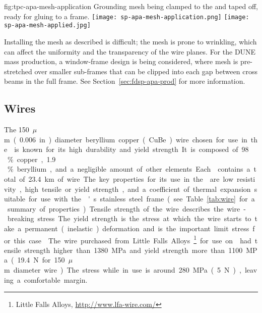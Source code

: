 \begin{dunefigure}{fig:tpc-apa-mesh-application}
{Grounding mesh being clamped to the  and taped off, ready for gluing to a  frame.}
\texttt{[image: sp-apa-mesh-application.png]} \quad
\texttt{[image: sp-apa-mesh-applied.jpg]}
\end{dunefigure}

Installing the mesh as described is difficult; the mesh is prone to wrinkling, %
which can affect the \efield uniformity and the transparency of the wire planes. For the DUNE mass production, a window-frame design is being considered, where mesh is pre-stretched over smaller sub-frames that can be clipped into each gap between cross beams in the full  frame.  See Section~\ref{sec:fdsp-apa-prod} for more information.


\subsection{Wires}
\label{sec:fdsp-apa-wires}

The \SI{150}{$\mu$m} (\SI{.006}{in}) diameter beryllium copper (CuBe) wire chosen for use in the  is known for its high durability and yield strength. It is composed of \num{98}\,\% copper, \num{1.9}\,\% beryllium, and a negligible amount of other elements. Each  contains a total of \SI{23.4}{km} of wire.  

The key properties for its use in the  are low resistivity, high tensile or yield strength, and a coefficient of thermal expansion suitable for use with the 's stainless steel frame (see Table~\ref{tab:wire} for a summary of properties).  Tensile strength of the wire describes the wire-breaking stress.  The yield strength is the stress at which the wire starts to take a permanent (inelastic) deformation and is the important limit stress for this case.  The wire purchased from Little Falls Alloys~\footnote{Little Falls Alloys\texttrademark, \url{http://www.lfa-wire.com/}} for use on  had tensile strength higher than \SI{1380}{MPa} and yield strength more than \SI{1100}{MPa} (\SI{19.4}{N} for \SI{150}{$\mu$m} diameter wire).  The stress while in use is around \SI{280}{MPa} (\SI{5}{N}), leaving a comfortable margin.

